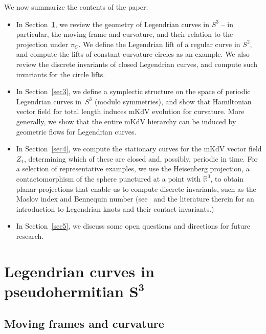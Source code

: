 \documentclass[pdftex]{sigma}
\def\R{\mathbb R}
\numberwithin{equation}{section}
\begin{document}
We now summarize the contents of the paper:
\begin{itemize}\itemsep=0pt
\item[--]
In Section~\ref{sec2}, we review the geometry of Legendrian curves in $S^3$ -- in particular, the moving frame and curvature, and their relation to the projection under $\pi_C$. We define the Legendrian lift of a regular curve
in $S^2$, and compute the lifts of constant curvature circles as an example. We also review the discrete invariants of closed Legendrian curves, and compute such invariants for the circle lifts.
\item[--]
In Section~\ref{sec3}, we define a symplectic structure on the space of periodic Legendrian curves in~$S^3$ (modulo symmetries), and show that Hamiltonian vector field for total length induces mKdV evolution for curvature. More generally, we show that the entire mKdV hierarchy
can be induced by geometric flows for Legendrian curves.
\item[--]
In Section~\ref{sec4}, we compute the stationary curves for the mKdV vector field $Z_1$,
determining which of these are closed and, possibly, periodic in time. For a selection of representative examples, we use the Heisenberg projection, a contactomorphism of the sphere punctured at a point with $\R^3$, to obtain planar projections
that enable us to compute discrete invariants,
such as the Maslov index and Bennequin number (see~\cite{ET1} and the literature therein for an introduction to Legendrian knots and their contact invariants.)
\item[--]
In Section~\ref{sec5}, we discuss some open questions and directions for future research.
\end{itemize}

\section[Legendrian curves in pseudohermitian S\^{}3]{Legendrian curves in pseudohermitian $\boldsymbol{S^3}$}\label{sec2}
\subsection{Moving frames and curvature}\label{geometrysection}
\end{document}
